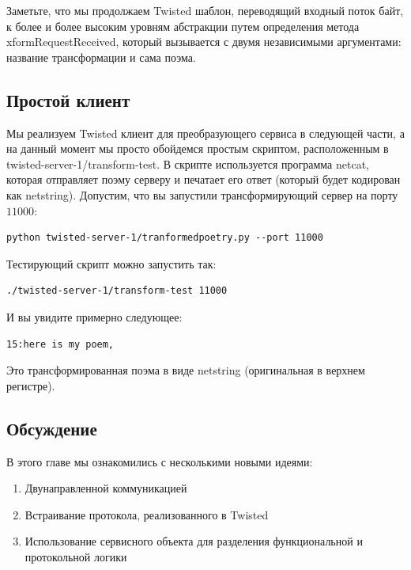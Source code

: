Заметьте, что мы продолжаем
Twisted шаблон, переводящий входный 
поток байт, к более и более высоким 
уровням абстракции путем определения метода 
xformRequestReceived, который вызывается с двумя независимыми 
аргументами: название трансформации и сама поэма.


\subsection{Простой клиент}


Мы реализуем Twisted клиент для преобразующего 
сервиса в следующей части, а на данный момент мы 
просто обойдемся простым скриптом, расположенным в twisted-server-1/transform-test.
В скрипте используется программа netcat, 
которая отправляет поэму серверу и печатает его ответ (который 
будет кодирован как netstring). Допустим, что вы запустили 
трансформирующий сервер на порту $11000$:

\begin{scriptsize}\begin{verbatim}
python twisted-server-1/tranformedpoetry.py --port 11000
\end{verbatim}\end{scriptsize}

Тестирующий скрипт можно запустить так:

\begin{scriptsize}\begin{verbatim}
./twisted-server-1/transform-test 11000
\end{verbatim}\end{scriptsize}

И вы увидите примерно следующее:

\begin{scriptsize}\begin{verbatim}
15:here is my poem,
\end{verbatim}\end{scriptsize}

Это трансформированная поэма в виде netstring (оригинальная в верхнем регистре).


\subsection{Обсуждение}


В этого главе мы ознакомились с несколькими новыми идеями:

\begin{enumerate}
\item Двунаправленной коммуникацией
\item Встраивание протокола, реализованного в Twisted
\item Использование сервисного объекта для разделения функциональной и 
протокольной логики
\end{enumerate} 


